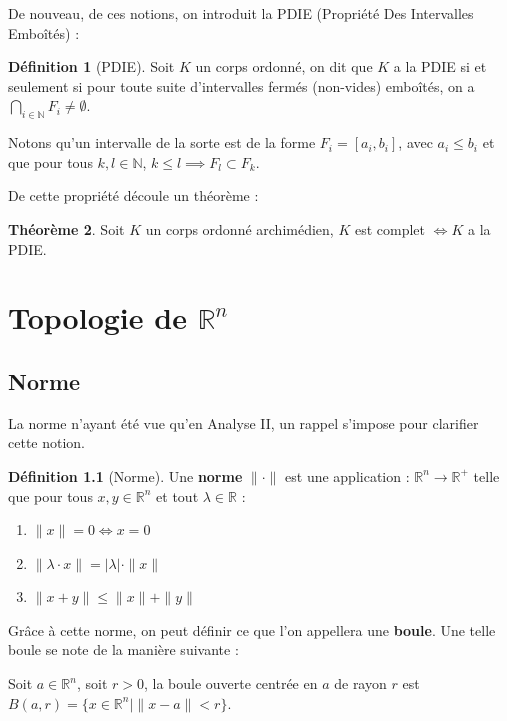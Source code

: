 \documentclass[12pt, a4paper]{report}
\theoremstyle{definition}
\newtheorem{definition}{Définition}[chapter]
\newtheorem{theoreme}[definition]{Théorème}
\begin{document}
De nouveau, de ces notions, on introduit la PDIE (Propriété Des Intervalles Emboîtés) :
\begin{definition}[PDIE]
Soit $K$ un corps ordonné, on dit que $K$ a la PDIE si et seulement si pour toute suite d'intervalles fermés (non-vides) emboîtés, on a $\bigcap_{i \in \mathbb{N}} F_i \neq \emptyset$.
\end{definition}
Notons qu'un intervalle de la sorte est de la forme $F_i = [a_i, b_i]$, avec $a_i \le b_i$ et que pour tous $k, l \in \mathbb{N}$, $k \le l \implies F_l \subset F_k$.

De cette propriété découle un théorème :
\begin{theoreme}
Soit $K$ un corps ordonné archimédien, $K$ est complet $\iff K$ a la PDIE.
\end{theoreme}


\chapter{Topologie de $\mathbb{R}^{n}$}
\section{Norme}
La norme n'ayant été vue qu'en Analyse II, un rappel s'impose pour clarifier cette notion.
\begin{definition}[Norme]
Une \textbf{norme} $\|\cdot\|$ est une application : $\mathbb{R}^{n} \to \mathbb{R}^{+}$ telle que pour tous $x, y \in \mathbb{R}^{n}$ et tout $\lambda \in \mathbb{R}$ :
\begin{enumerate}
    \item $\|x\| = 0 \iff x = 0$
    \item $\|\lambda \cdot x\| = |\lambda| \cdot \|x\|$
    \item $\|x + y\| \le \|x\| + \|y\|$
\end{enumerate}
\end{definition}
Grâce à cette norme, on peut définir ce que l'on appellera une \textbf{boule}. Une telle boule se note de la manière suivante :

Soit $a \in \mathbb{R}^{n}$, soit $r > 0$, la boule ouverte centrée en $a$ de rayon $r$ est $B(a, r) = \{x \in \mathbb{R}^{n} \mid \|x - a\| < r \}$.
\end{document}
